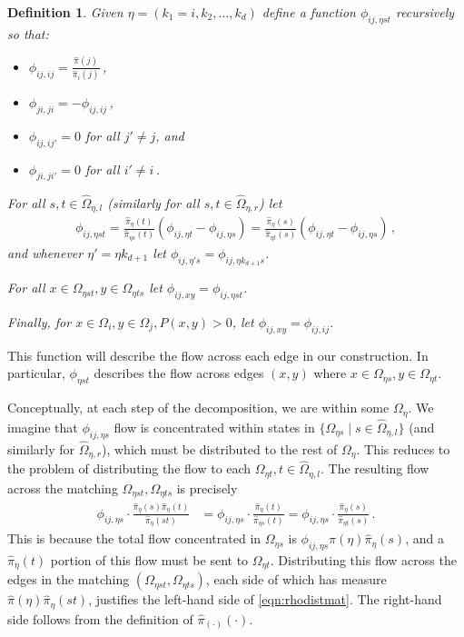 \documentclass[a4paper, 12p]{article}
\numberwithin{equation}{section}
\newcommand{\Omorproj}{\hat{\Omega}}
\newcommand{\piorproj}{\hat{\pi}}
\newtheorem{definition}[theorem]{Definition}
\begin{document}
\begin{definition}
    Given $\eta = (k_1 = i, k_2, \dots, k_d)$ define a function $\phi_{ij,\eta s t}$ recursively so that:
\begin{itemize}
    \item $\phi_{ij,ij} = \frac{\piorproj(j)}{\piorproj_i(j)}$\,,
    \item  $\phi_{ji,ji} = -\phi_{ij,ij}$\,,
    \item  $\phi_{ij,ij'} = 0$ for all $j' \neq j$, and
    \item $\phi_{ji,ji'} = 0$ for all $i' \neq i$\,.
\end{itemize}

For all $s, t \in \Omorproj_{\eta, l}$ (similarly for all $s, t \in \Omorproj_{\eta, r}$) let
\begin{align}
   \phi_{ij, \eta s t} = \frac{\piorproj_{\eta}(t)}{\piorproj_{\eta s}(t)}(\phi_{ij, \eta t} - \phi_{ij, \eta s}) = \frac{\piorproj_{\eta}(s)}{\piorproj_{\eta t}(s)}(\phi_{ij, \eta t} - \phi_{ij, \eta s}) \,,\label{eqn:rhoetast}
\end{align}
and whenever $\eta' = \eta k_{d+1}$ let $\phi_{ij,\eta' s} = \phi_{ij,\eta k_{d+1} s}$.

For all $x \in \Omega_{\eta st}, y \in \Omega_{\eta t s}$ let    $\phi_{ij,xy} = \phi_{ij,\eta s t}$.

Finally, for $x \in \Omega_i, y \in \Omega_j, P(x, y) > 0$, let $\phi_{ij,xy} = \phi_{ij,ij}$.
\end{definition}

This function will describe the flow across each edge in our construction. In particular, $\phi_{\eta st}$ describes the flow across edges $(x, y)$ where $x \in \Omega_{\eta s}, y \in \Omega_{\eta t}$.  

Conceptually, at each step of the decomposition, we are within some $\Omega_{\eta}$. We imagine that $\phi_{ij,\eta s}$ flow is concentrated within states in $\{\Omega_{\eta s} \mid s \in \Omorproj_{\eta, l}\}$ (and similarly for $\Omorproj_{\eta, r}$), which must be distributed to the rest of $\Omega_{\eta}$. This reduces to the problem of distributing the flow to each $\Omega_{\eta t}, t \in \Omorproj_{\eta, l}$. The resulting flow across the matching $\Omega_{\eta st}, \Omega_{\eta t s}$ is precisely 
\begin{align}
    \phi_{ij, \eta s}  \cdot \frac{\piorproj_{\eta}(s)\piorproj_{\eta}(t)}{\piorproj_{\eta}(s t)}  &= \phi_{ij, \eta s}\cdot \frac{\piorproj_{\eta}(t)}{\piorproj_{\eta s}(t)} = \phi_{ij, \eta s}\cdot \frac{\piorproj_{\eta}(s)}{\piorproj_{\eta t}(s)}\,. \label{eqn:rhodistmat}
\end{align}
This is because the total flow concentrated in $\Omega_{\eta s}$ is $\phi_{ij, \eta s}\piorproj(\eta)\piorproj_{\eta}(s)$, and a $\piorproj_{\eta}(t)$ portion of this flow must be sent to $\Omega_{\eta t}$. Distributing this flow across the edges in the matching $(\Omega_{\eta s t}, \Omega_{\eta t s})$, each side of which has measure $\piorproj(\eta)\piorproj_{\eta}(st)$, justifies the left-hand side of \eqref{eqn:rhodistmat}. The right-hand side follows from the definition of $\piorproj_{(\cdot)}(\cdot)$.
\end{document}
